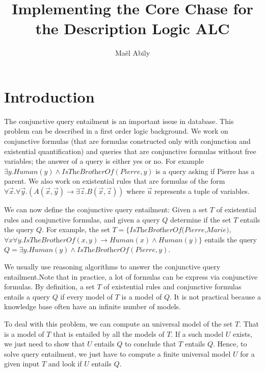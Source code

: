 \documentclass{article}
\title{Implementing the Core Chase for the Description Logic ALC}
\author{Maël Abily}
\theoremstyle{definition}
\theoremstyle{remark}
\begin{document}
\maketitle						%



\section{Introduction}

The conjunctive query entailment is an important issue in database. This problem can be described in a first order logic background. We work on conjunctive formulas (that are formulas constructed only with conjunction and existential quantification) and queries that are conjunctive formulas without free variables; the answer of a query is either yes or no. For example $ \exists y. \textit{Human}(y) \wedge \textit{IsTheBrotherOf}(Pierre,y)$ is a query asking
if Pierre has a parent. We also work on existential rules that are formulas of the form $\forall \vec x.\forall \vec y.( A(\vec x,\vec y) \rightarrow \exists \vec z. B(\vec x,\vec z))$ where $\vec u$ represents a tuple of variables.

We can now define the conjunctive query entailment: Given a set $T$ of existential rules and conjunctive formulas, and given a query $Q$ determine if the set $T$ entails the query $Q$. For example, the set $T= \{\textit{IsTheBrotherOf(Pierre,Marie)},$ $\forall x \forall y. \textit{IsTheBrotherOf}(x,y) \rightarrow \textit{Human}(x) \wedge \textit{Human}(y) \}$ entails the query $Q=\exists y. \textit{Human}(y) \wedge \textit{IsTheBrotherOf}(Pierre,y)$.



We usually use reasoning algorithms to answer the conjunctive query entailment.Note that in practice, a lot of formulas can be express via conjunctive formulas. By definition, a set $T$ of existential rules and conjunctive formulas entails a query $Q$ if every  model of $T$ is a model of $Q$. It is not practical because a knowledge base often have an infinite number of models.

To deal with this problem, we can compute an universal model of the set $T$. That is a model of $T$ that is entailed by all the models of $T$. If a such model $U$ exists, we just need to show that $U$ entails $Q$ to conclude that $T$ entails $Q$. Hence, to solve query entailment, we just have to compute a finite universal model $U$ for a given input $T$ and look if $U$ entails $Q$.
\end{document}
